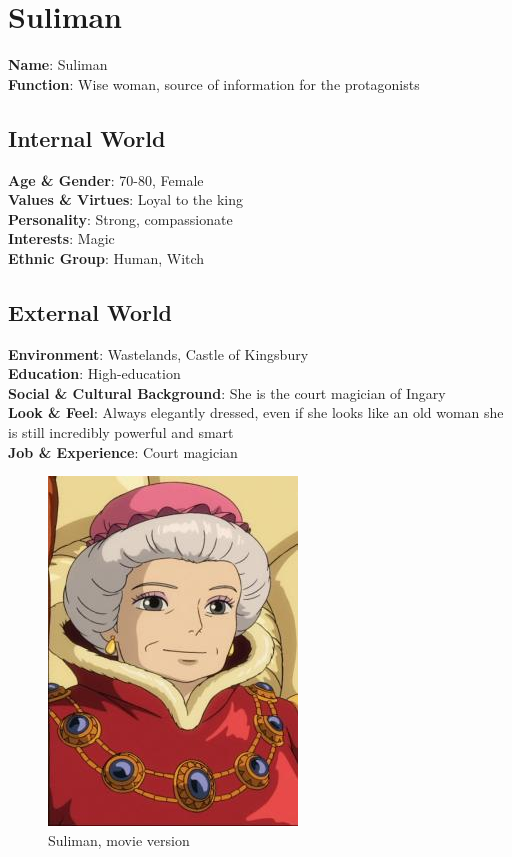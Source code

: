 \section{Suliman}

\begin{minipage}{0.5\textwidth}
\textbf{Name}: Suliman\\
\textbf{Function}: Wise woman, source of information for the protagonists

\subsection{Internal World}

\textbf{Age \& Gender}: 70-80, Female \\
\textbf{Values \& Virtues}: Loyal to the king \\
\textbf{Personality}: Strong, compassionate\\
\textbf{Interests}: Magic \\
\textbf{Ethnic Group}: Human, Witch

\subsection{External World}
\textbf{Environment}: Wastelands, Castle of Kingsbury \\
\textbf{Education}: High-education \\
\textbf{Social \& Cultural Background}: She is the court magician of Ingary \\
\textbf{Look \& Feel}: Always elegantly dressed, even if she looks like an old woman she is still incredibly powerful and smart \\
\textbf{Job \& Experience}: Court magician \\

\end{minipage}%
%
\hfill\begin{minipage}{0.4\textwidth}
  \begin{figure}[H]
  \includegraphics{Images/Characters/suliman}
  \caption{Suliman, movie version}
\end{figure}
\end{minipage}

